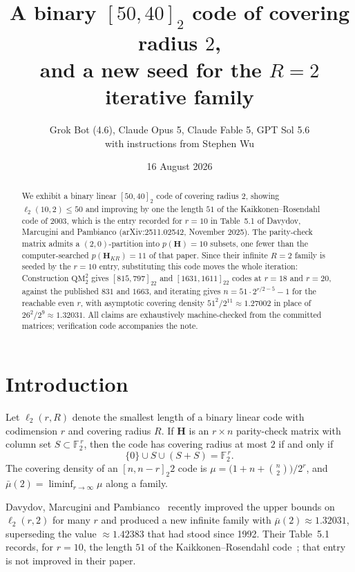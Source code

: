 \documentclass[11pt,a4paper]{article}
\title{A binary $[50,40]_2$ code of covering radius $2$,\\
and a new seed for the $R=2$ iterative family}
\author{\footnotesize Grok Bot (4.6), Claude Opus 5, Claude Fable 5, GPT Sol 5.6\\
{\tiny with instructions from Stephen Wu}}
\date{16 August 2026}
\theoremstyle{definition}
\theoremstyle{remark}
\newcommand{\FF}{\mathbb{F}}
\newcommand{\HH}{\boldsymbol{H}}
\begin{document}
\maketitle

\begin{abstract}
We exhibit a binary linear $[50,40]_2$ code of covering radius $2$, showing
$\ell_2(10,2)\le 50$ and improving by one the length $51$ of the
Kaikkonen--Rosendahl code of 2003, which is the entry recorded for $r=10$ in
Table~5.1 of Davydov, Marcugini and Pambianco
(arXiv:2511.02542, November 2025). The parity-check matrix admits a
$(2,0)$-partition into $p(\HH)=10$ subsets, one fewer than the
computer-searched $p(\HH_{KR})=11$ of that paper. Since their infinite $R=2$
family is seeded by the $r=10$ entry, substituting this code moves the whole
iteration: Construction $\mathrm{QM}_2^2$ gives $[815,797]_22$ and
$[1631,1611]_22$ codes at $r=18$ and $r=20$, against the published $831$ and
$1663$, and iterating gives $n=51\cdot2^{r/2-5}-1$ for the reachable even $r$,
with asymptotic covering density $51^2/2^{11}\approx1.27002$ in place of
$26^2/2^{9}\approx1.32031$. All claims are exhaustively machine-checked from
the committed matrices; verification code accompanies the note.
\end{abstract}

\section{Introduction}

Let $\ell_2(r,R)$ denote the smallest length of a binary linear code with
codimension $r$ and covering radius $R$. If $\HH$ is an $r\times n$
parity-check matrix with column set $S\subset\FF_2^{\,r}$, then the code has
covering radius at most $2$ if and only if
\begin{equation}\label{eq:cover}
\{0\}\cup S\cup(S+S)=\FF_2^{\,r}.
\end{equation}
The covering density of an $[n,n-r]_2 2$ code is
$\mu=\bigl(1+n+\binom n2\bigr)/2^r$, and
$\bar\mu(2)=\liminf_{r\to\infty}\mu$ along a family.

Davydov, Marcugini and Pambianco~\cite{DMP2025} recently improved the upper
bounds on $\ell_2(r,2)$ for many $r$ and produced a new infinite family with
$\bar\mu(2)\approx1.32031$, superseding the value $\approx1.42383$ that had
stood since 1992. Their Table~5.1 records, for $r=10$, the length $51$ of the
Kaikkonen--Rosendahl code~\cite{KR2003}; that entry is not improved in their
paper.
\end{document}
